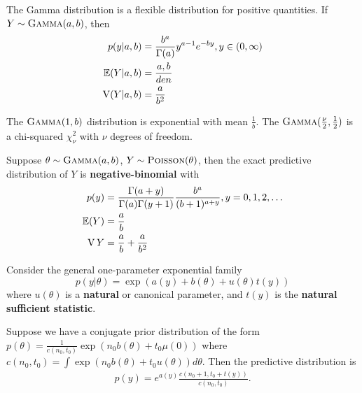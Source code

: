 \begin{defn}
  \label{sec:prob-bayes-theor-8}
  The Gamma distribution is a flexible distribution for positive
  quantities.  If $Y \sim \textsc{Gamma}(a, b)$, then
  \begin{align}
    \label{eq:6}
    p(y|a,b) &= \frac{b^{a}}{\Gamma(a)} y^{a-1} e^{-by}, y \in (0,
    \infty) \\
    \E{Y|a, b} &= \frac{a, b}{den} \\
    \V(Y|a, b) &= \frac{a}{b^{2}}
  \end{align}

  The $\textsc{Gamma}(1, b)$ distribution is exponential with mean
  $\frac{1}{b}$. The $\textsc{Gamma}(\frac{\nu}{2}, \frac{1}{2})$ is a
  chi-squared $\chi^{2}_{\nu}$ with $\nu$ degrees of freedom.
\end{defn}

\begin{thm}
  \label{sec:prob-bayes-theor-9}
  Suppose $\theta \sim \textsc{Gamma}(a, b)$, $Y \sim \textsc{Poisson}(\theta)$, then
  the exact predictive distribution of $Y$ is
  \textbf{negative-binomial} with
  \begin{align}
    \label{eq:8}
    p(y) &= \frac{\Gamma(a+y)}{\Gamma(a) \Gamma(y+1)}
    \frac{b^{a}}{(b+1)^{a+y}}, y= 0, 1, 2, \dots \\
    \E{Y} &= \frac{a}{b} \\
    \V{Y} &= \frac{a}{b} + \frac{a}{b^{2}}
  \end{align}
\end{thm}

\begin{thm}
  \label{sec:prob-bayes-theor-10}
  Consider the general one-parameter exponential family
  \begin{equation}
    \label{eq:9}
    p(y|\theta) = \exp(a(y) + b(\theta) + u(\theta)t(y))
  \end{equation} where $u(\theta)$ is a \textbf{natural} or canonical
  parameter, and $t(y)$ is the \textbf{natural sufficient statistic}.

  Suppose we have a conjugate prior distribution of the form
  $p(\theta) = \frac{1}{c(n_{0}, t_{0})} \exp(n_{0} b(\theta) + t_{0}
  \mu(0))$ where $c(n_{0}, t_{0}) = \int \exp(n_{0} b(\theta) + t_{0}
  u(\theta)) d\theta$.  Then the predictive distribution is
  \begin{align}
    \label{eq:10}
    p(y) = e^{a(y)} \frac{c(n_{0} + 1, t_{0} + t(y))}{c(n_{0}, t_{0})}.
  \end{align}
\end{thm}


